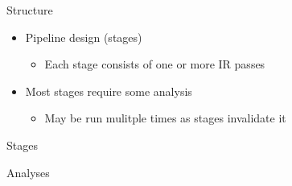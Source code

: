 

\begin{frame}{Structure}

\begin{itemize}
    \item Pipeline design (stages)
    \begin{itemize}
        \item Each stage consists of one or more IR passes
    \end{itemize}
    
    \item Most stages require some analysis
    \begin{itemize}
        \item May be run mulitple times as stages invalidate it
    \end{itemize}
\end{itemize}

\end{frame}


\begin{frame}{Stages}

\end{frame}


\begin{frame}{Analyses}

\end{frame}



